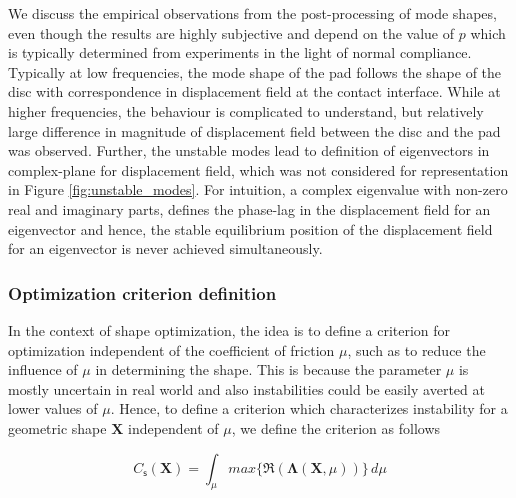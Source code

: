 We discuss the empirical observations from the post-processing of mode shapes, even though the results are highly subjective and depend on the value of $p$ which is typically determined from experiments in the light of normal compliance.
Typically at low frequencies, the mode shape of the pad follows the shape of the disc with correspondence in displacement field at the contact interface. While at higher frequencies, the behaviour is complicated to understand, but relatively large difference in magnitude of displacement field between the disc and the pad was observed. 
Further, the unstable modes lead to definition of eigenvectors in complex-plane for displacement field, which was not considered for representation in Figure \ref{fig:unstable_modes}. 
For intuition, a complex eigenvalue with non-zero real and imaginary parts, defines the phase-lag in the displacement field for an eigenvector and hence, the stable equilibrium position of the displacement field for an eigenvector is never achieved simultaneously.\\

\subsubsection{Optimization criterion definition}

In the context of shape optimization, the idea is to define a criterion for optimization independent of the coefficient of friction ${\mu}$, such as to reduce the influence of ${\mu}$ in determining the shape. This is because the parameter $\mu$ is mostly uncertain in real world and also instabilities could be easily averted at lower values of ${\mu}$. Hence, to define a criterion which characterizes instability for a geometric shape $\bm X$ independent of ${\mu}$, we define the criterion as follows
 
 \begin{equation}
C_{\mathsf s}(\bm X)=\int_{{\mu}} max\{\Re(\bm \Lambda(\bm X,{\mu}))\}\,d{\mu}
    \label{eq:firststabcrit}
\end{equation}
 
